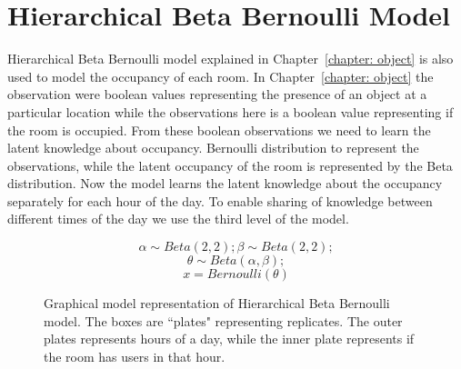 \section{Hierarchical Beta Bernoulli Model}

Hierarchical Beta Bernoulli model explained in Chapter~\ref{chapter: object} is also used to model the occupancy of each room. In Chapter~\ref{chapter: object} the observation were boolean values representing the presence of an object at a particular location while the observations here is a boolean value representing if the room is occupied. From these boolean observations we need to learn the latent knowledge about occupancy. Bernoulli distribution to represent the observations, while the latent occupancy of the room is represented by the Beta distribution. 
Now the model learns the latent knowledge about the occupancy separately for each hour of the day. To enable sharing of knowledge between different times of the day we use the third level of the model.
\noindent
\begin{figure}[htp]


\begin{minipage}{0.3\textwidth}
\centering


\end{minipage}%
\begin{minipage}{0.7\textwidth}

\begin{equation*}
	\alpha \sim Beta(2,2) ; \beta \sim Beta(2, 2);
\end{equation*}
\begin{equation*}
	\theta \sim Beta(\alpha, \beta);
\end{equation*}
\begin{equation*}
	x = Bernoulli(\theta)
\end{equation*}
\end{minipage}
\caption[Hierarchical Beta Bernoulli graphical model]{Graphical model representation of Hierarchical Beta Bernoulli model. The boxes are ``plates" representing replicates. The outer plates represents hours of a day, while the inner plate represents if the room has users in that hour.}
\label{bbm2}
\end{figure}



